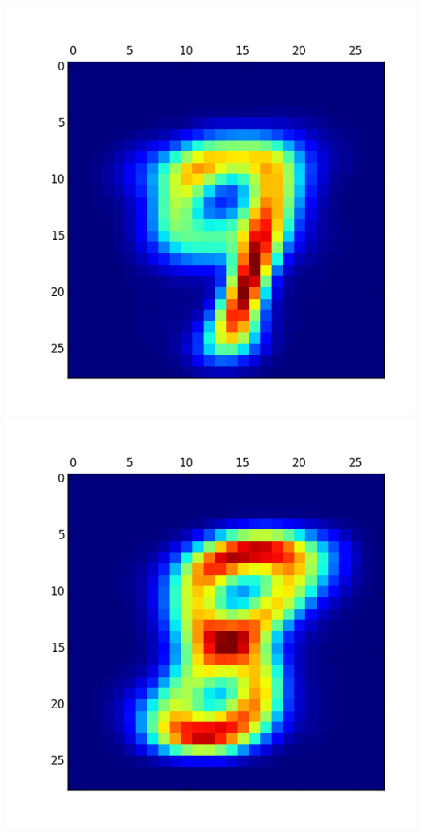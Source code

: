\documentclass[11pt]{article}
\begin{document}
\begin{itemize}
\includegraphics[scale = 0.5]{6.png}
\includegraphics[scale = 0.5]{7.png}


\end{itemize}
\end{document}

